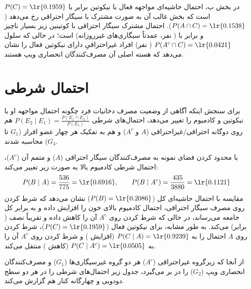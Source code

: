 \documentclass[12pt]{exam}
\begin{document}
در بخش ب، احتمال حاشیه‌ای مواجهه فعال با نیکوتین برابر با $P(C) = \text{\lr{0.1959}}$ است که بخش غالب آن به صورت مشترک با سیگار احتراقی رخ می‌دهد ($P(A \cap C) = \text{\lr{0.1538}}$). احتمال مشترک سیگار احتراقی با کوتینین زیر  بسیار ناچیز و برابر با  ( نفر، عمدتاً سیگاری‌های غیرروزانه) است؛ در حالی که سلول $P(A^c \cap C) = \text{\lr{0.0421}}$ ( نفر) افراد غیراحتراقیِ دارای نیکوتین فعال را نشان می‌دهد که هسته اصلی آن مصرف‌کنندگان انحصاری ویپ هستند.


\section{احتمال شرطی}

برای سنجش اینکه آگاهی از وضعیت مصرف دخانیات فرد چگونه احتمال مواجهه او با نیکوتین و کادمیوم را تغییر می‌دهد، احتمال‌های شرطی $P(E_2 \mid E_1) = \frac{P(E_1 \cap E_2)}{P(E_1)}$ هم روی دوگانه احتراقی/غیراحتراقی ($A$ و $A^c$) و هم به تفکیک هر چهار عضو افراز ($G_1$ تا $G_4$) محاسبه شدند.

با محدود کردن فضای نمونه به مصرف‌کنندگان سیگار احتراقی ($A$) و متمم آن ($A^c$)، احتمال شرطی کادمیوم بالا به صورت زیر تغییر می‌کند:
$$
P(B \mid A) = \frac{536}{775} = \text{\lr{0.6916}}, \qquad P(B \mid A^c) = \frac{435}{3880} = \text{\lr{0.1121}}
$$
مقایسه با احتمال حاشیه‌ای کل ($P(B) = \text{\lr{0.2086}}$) نشان می‌دهد که شرط کردن روی مصرف سیگار احتراقی، احتمال کادمیوم بالای خون را  افزایش داده و به  برابر کل جامعه می‌رساند، در حالی که شرط کردن روی $A^c$ آن را  کاهش داده و تقریباً نصف ( برابر) می‌کند. به طور مشابه، برای نیکوتین فعال ($P(C) = \text{\lr{0.1959}}$)، شرط کردن روی $A$ احتمال را به $P(C \mid A) = \text{\lr{0.9239}}$ (افزایش ) و شرط کردن روی $A^c$ آن را به $P(C \mid A^c) = \text{\lr{0.0505}}$ (کاهش ) منتقل می‌کند.

از آنجا که زیرگروه غیراحتراقی ($A^c$) هر دو گروه غیرسیگاری‌ها ($G_1$) و مصرف‌کنندگان انحصاری ویپ ($G_2$) را در بر می‌گیرد، جدول زیر احتمال‌های شرطی را در هر دو سطح دودویی و چهارگانه کنار هم گزارش می‌کند.
\end{document}
